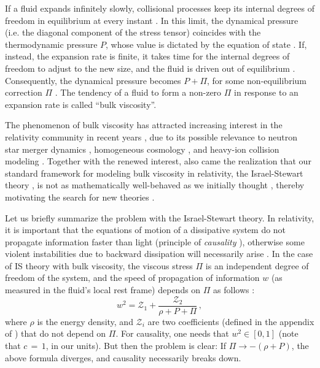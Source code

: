 \documentclass[a4paper, amsfonts, amssymb, amsmath, reprint, showkeys, nofootinbib, twoside,notitlepage,onecolumn]{revtex4-2}
\theoremstyle{definition}
\theoremstyle{theorem}
\theoremstyle{corollary}
\begin{document}
If a fluid expands infinitely slowly, collisional processes keep its internal degrees of freedom in equilibrium at every instant \cite[\S 11]{landau5}. In this limit, the dynamical pressure (i.e. the diagonal component of the stress tensor)  coincides with the thermodynamic pressure $P$, whose value is dictated by the equation of state \cite[\S 12]{landau5}. If, instead, the expansion rate is finite, it takes time for the internal degrees of freedom to adjust to the new size, and the fluid is driven out of equilibrium \cite{Tisza_Bulk}. Consequently, the dynamical pressure becomes $P{+}\Pi$, for some non-equilibrium correction $\Pi$ \cite[\S 81]{landau6}. The tendency of a fluid to form a non-zero $\Pi$ in response to an expansion rate is called ``bulk viscosity''.

The phenomenon of bulk viscosity has attracted increasing interest in the relativity community in recent years \cite{HuangBulk2010sa,BulkGavassino,Chabanov:2021dee,Camelio2022,CamelioSimulations2022,CeloraBulk2022nbp,GavassinoBurgers2023,GavassinoFarFromBulk2023}, due to its possible relevance to neutron star merger dynamics \cite{Sawyer_Bulk1989,Alford_2010,AlfordBulk,AlfordRezzolla,MostAlfordNoronhaBulk2021zvc,YangNoronha2023ozd}, homogeneous cosmology \cite{Weinberg1971,Salmonson1991,Otting3_1999,Maartens1995,Zimdahl1996,Fabris2006,Colistete2007}, and heavy-ion collision modeling \cite{Song:2009rh,Dusling:2011fd,PaquetDenicolBulk2015,Hydro+2018}. Together with the renewed interest, also came the realization that our standard framework for modeling bulk viscosity in relativity, the Israel-Stewart theory \cite{Israel_Stewart_1979,Hishcock1983}, is not as mathematically well-behaved as we initially thought \cite{Causality_bulk,Plumberg2022}, thereby motivating the search for new theories \cite{BemficaDNDefinitivo2020}. 

Let us briefly summarize the problem with the Israel-Stewart theory. In relativity, it is important that the equations of motion of a dissipative system do not propagate information faster than light (principle of \textit{causality} \cite{Bemfica2017TheFirst}), otherwise some violent instabilities due to backward dissipation will necessarily arise \cite{GavassinoSuperluminal2021}. In the case of IS theory with bulk viscosity, the viscous stress $\Pi$ is an independent degree of freedom of the system, and the speed of propagation of information $w$ (as measured in the fluid's local rest frame) depends on $\Pi$ as follows \cite{Causality_bulk}:
\begin{equation}
w^2=\mathcal{Z}_1 +\dfrac{\mathcal{Z}_2}{\rho {+}P{+}\Pi} \, ,
\end{equation}
where $\rho$ is the energy density, and $\mathcal{Z}_i$ are two coefficients (defined in the appendix of \cite{Causality_bulk}) that do not depend on $\Pi$. For causality, one needs that $w^2 \in [0,1]$ (note that $c \,{=}\, 1$, in our units). But then the problem is clear: If $\Pi \rightarrow -(\rho {+}P)$, the above formula diverges, and causality necessarily breaks down.
\end{document}

